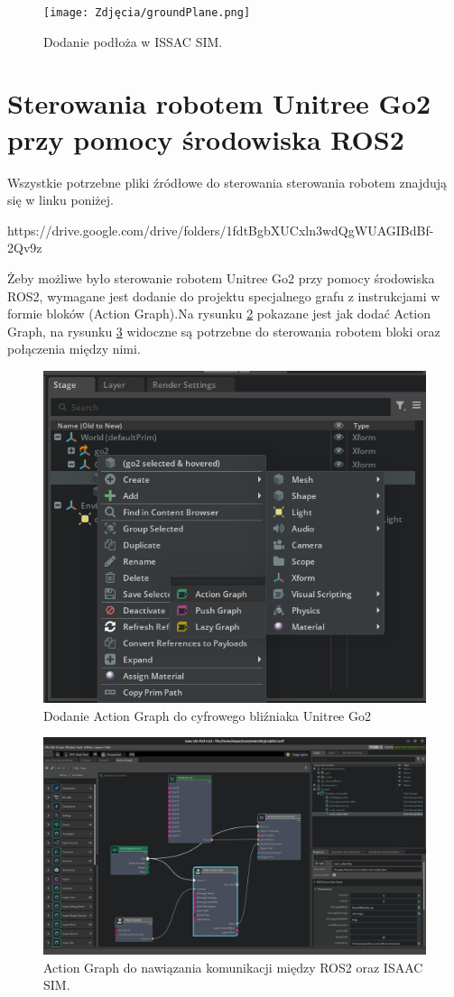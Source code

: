 \documentclass[12pt]{article}
\begin{document}
\begin{figure}[h]
    \centering
    \texttt{[image: Zdjęcia/groundPlane.png]}
    \caption{Dodanie podłoża w ISSAC SIM.}
    \label{fig:groundPlane}
\end{figure}

\clearpage

\section{Sterowania robotem Unitree Go2 przy pomocy środowiska ROS2}

Wszystkie potrzebne pliki źródłowe do sterowania sterowania robotem znajdują się w linku poniżej.

https://drive.google.com/drive/folders/1fdtBgbXUCxln3wdQgWUAGIBdBf-2Qv9z
\vspace{10pt}

Żeby możliwe było sterowanie robotem Unitree Go2 przy pomocy środowiska ROS2, wymagane jest dodanie do projektu specjalnego grafu z instrukcjami w formie bloków (Action Graph).Na rysunku \ref{fig:jakDodacAction} pokazane jest jak dodać Action Graph, na rysunku \ref{fig:actionGraph} widoczne są potrzebne do sterowania robotem bloki oraz połączenia między nimi. 

\begin{figure}[h]
    \centering
    \includegraphics[width=0.7\linewidth]{Zdjęcia/dodanieActionGraph.png}
    \caption{Dodanie Action Graph do cyfrowego bliźniaka Unitree Go2}
    \label{fig:jakDodacAction}
\end{figure}

\clearpage

\begin{figure}[h]
    \centering
    \includegraphics[width=0.75\linewidth]{Zdjęcia/actionGraph.png}
    \caption{Action Graph do nawiązania komunikacji między ROS2 oraz ISAAC SIM.}
    \label{fig:actionGraph}
\end{figure}
\end{document}
